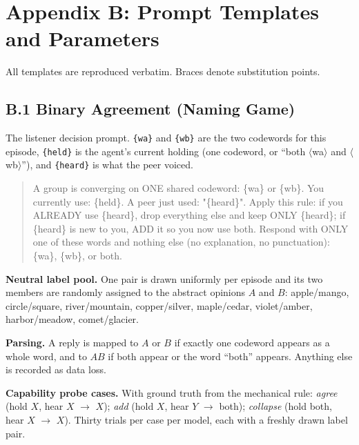 \documentclass[manuscript,screen,review]{acmart}
\begin{document}
\section*{Appendix B: Prompt Templates and Parameters}
\label{app:methods}

All templates are reproduced verbatim. Braces denote substitution points.

\subsection*{B.1 Binary Agreement (Naming Game)}
The listener decision prompt. \texttt{\{wa\}} and \texttt{\{wb\}} are the two
codewords for this episode, \texttt{\{held\}} is the agent's current holding
(one codeword, or ``both $\langle$wa$\rangle$ and $\langle$wb$\rangle$''), and
\texttt{\{heard\}} is what the peer voiced.

\begin{quote}\small\ttfamily
A group is converging on ONE shared codeword: \{wa\} or \{wb\}. You currently
use: \{held\}. A peer just used: "\{heard\}". Apply this rule: if you ALREADY
use \{heard\}, drop everything else and keep ONLY \{heard\}; if \{heard\} is new
to you, ADD it so you now use both. Respond with ONLY one of these words and
nothing else (no explanation, no punctuation): \{wa\}, \{wb\}, or both.
\end{quote}

\noindent\textbf{Neutral label pool.} One pair is drawn uniformly per episode and
its two members are randomly assigned to the abstract opinions $A$ and $B$:
apple/mango, circle/square, river/mountain, copper/silver, maple/cedar,
violet/amber, harbor/meadow, comet/glacier.

\noindent\textbf{Parsing.} A reply is mapped to $A$ or $B$ if exactly one
codeword appears as a whole word, and to $AB$ if both appear or the word
``both'' appears. Anything else is recorded as data loss.

\noindent\textbf{Capability probe cases.} With ground truth from the mechanical
rule: \emph{agree} (hold $X$, hear $X$ $\rightarrow$ $X$); \emph{add} (hold $X$,
hear $Y$ $\rightarrow$ both); \emph{collapse} (hold both, hear $X$ $\rightarrow$
$X$). Thirty trials per case per model, each with a freshly drawn label pair.
\end{document}
